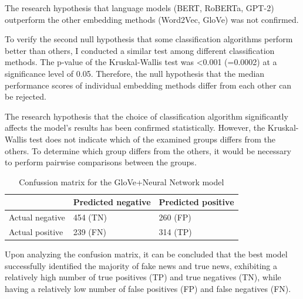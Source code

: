 The research hypothesis that language models (BERT, RoBERTa, GPT-2) outperform the other embedding methods (Word2Vec, GloVe) was not confirmed.

To verify the second null hypothesis that some classification algorithms perform better than others, I conducted a similar test among different classification methods.
The p-value of the Kruskal-Wallis test was <0.001 (=0.0002) at a significance level of 0.05. Therefore, the null hypothesis that the median performance scores of individual embedding methods differ from each other can be rejected.

The research hypothesis that the choice of classification algorithm significantly affects the model's results has been confirmed statistically.
However, the Kruskal-Wallis test does not indicate which of the examined groups differs from the others. To determine which group differs from the others, it would be necessary to perform pairwise comparisons between the groups.



\begin{table}[htb]
\centering
{
\makegapedcells
\begin{tabular}{lll}
                & Predicted negative & Predicted positive \\
\hline
Actual negative & 454 (TN)           & 260 (FP) \\
Actual positive & 239 (FN)           & 314 (TP) \\
\hline
\end{tabular}
}
\caption{Confussion matrix for the GloVe+Neural Network model}
\label{glovenn_cm}
\end{table}

Upon analyzing the confusion matrix, it can be concluded that the best model successfully identified the majority of fake news and true news, exhibiting a relatively high number of true positives (TP) and true negatives (TN), while having a relatively low number of false positives (FP) and false negatives (FN).